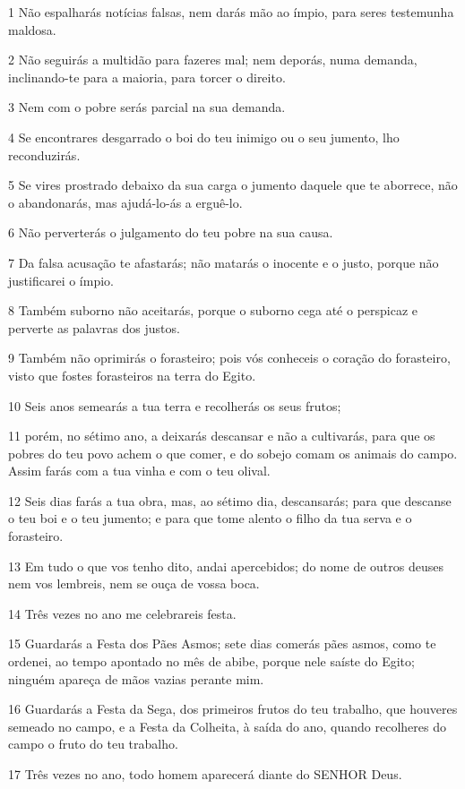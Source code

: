 \par 1 Não espalharás notícias falsas, nem darás mão ao ímpio, para seres testemunha maldosa.
\par 2 Não seguirás a multidão para fazeres mal; nem deporás, numa demanda, inclinando-te para a maioria, para torcer o direito.
\par 3 Nem com o pobre serás parcial na sua demanda.
\par 4 Se encontrares desgarrado o boi do teu inimigo ou o seu jumento, lho reconduzirás.
\par 5 Se vires prostrado debaixo da sua carga o jumento daquele que te aborrece, não o abandonarás, mas ajudá-lo-ás a erguê-lo.
\par 6 Não perverterás o julgamento do teu pobre na sua causa.
\par 7 Da falsa acusação te afastarás; não matarás o inocente e o justo, porque não justificarei o ímpio.
\par 8 Também suborno não aceitarás, porque o suborno cega até o perspicaz e perverte as palavras dos justos.
\par 9 Também não oprimirás o forasteiro; pois vós conheceis o coração do forasteiro, visto que fostes forasteiros na terra do Egito.
\par 10 Seis anos semearás a tua terra e recolherás os seus frutos;
\par 11 porém, no sétimo ano, a deixarás descansar e não a cultivarás, para que os pobres do teu povo achem o que comer, e do sobejo comam os animais do campo. Assim farás com a tua vinha e com o teu olival.
\par 12 Seis dias farás a tua obra, mas, ao sétimo dia, descansarás; para que descanse o teu boi e o teu jumento; e para que tome alento o filho da tua serva e o forasteiro.
\par 13 Em tudo o que vos tenho dito, andai apercebidos; do nome de outros deuses nem vos lembreis, nem se ouça de vossa boca.
\par 14 Três vezes no ano me celebrareis festa.
\par 15 Guardarás a Festa dos Pães Asmos; sete dias comerás pães asmos, como te ordenei, ao tempo apontado no mês de abibe, porque nele saíste do Egito; ninguém apareça de mãos vazias perante mim.
\par 16 Guardarás a Festa da Sega, dos primeiros frutos do teu trabalho, que houveres semeado no campo, e a Festa da Colheita, à saída do ano, quando recolheres do campo o fruto do teu trabalho.
\par 17 Três vezes no ano, todo homem aparecerá diante do SENHOR Deus.
